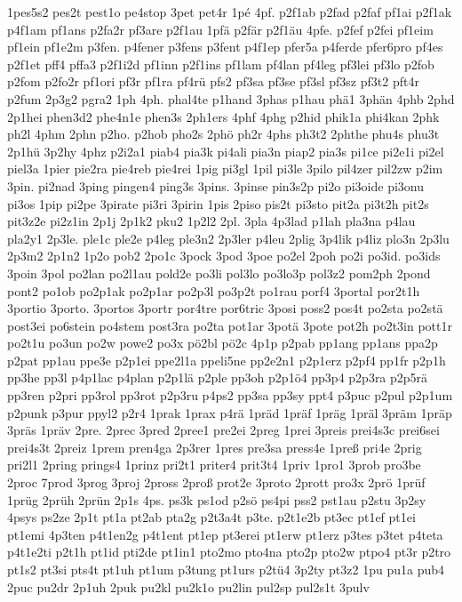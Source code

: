 {1pes5s2
pes2t
pest1o
pe4stop
3pet
pet4r
1pé
4pf.
p2f1ab
p2fad
p2faf
pf1ai
p2f1ak
p4f1am
pf1ans
p2fa2r
pf3are
p2f1au
1pfä
p2fär
p2f1äu
4pfe.
p2fef
p2fei
pf1eim
pf1ein
pf1e2m
p3fen.
p4fener
p3fens
p3fent
p4f1ep
pfer5a
p4ferde
pfer6pro
pf4es
p2f1et
pff4
pffa3
p2f1i2d
pf1inn
p2f1ins
pf1lam
pf4lan
pf4leg
pf3lei
pf3lo
p2fob
p2fom
p2fo2r
pf1ori
pf3r
pf1ra
pf4rü
pfs2
pf3sa
pf3se
pf3sl
pf3sz
pf3t2
pft4r
p2fum
2p3g2
pgra2
1ph
4ph.
phal4te
p1hand
3phas
p1hau
phä1
3phän
4phb
2phd
2p1hei
phen3d2
phe4n1e
phen3s
2ph1ers
4phf
4phg
p2hid
phik1a
phi4kan
2phk
ph2l
4phm
2phn
p2ho.
p2hob
pho2s
2phö
ph2r
4phs
ph3t2
2phthe
phu4s
phu3t
2p1hü
3p2hy
4phz
p2i2a1
piab4
pia3k
pi4ali
pia3n
piap2
pia3s
pi1ce
pi2e1i
pi2el
piel3a
1pier
pie2ra
pie4reb
pie4rei
1pig
pi3gl
1pil
pi3le
3pilo
pil4zer
pil2zw
p2im
3pin.
pi2nad
3ping
pingen4
ping3s
3pins.
3pinse
pin3s2p
pi2o
pi3oide
pi3onu
pi3os
1pip
pi2pe
3pirate
pi3ri
3pirin
1pis
2piso
pis2t
pi3sto
pit2a
pi3t2h
pit2s
pit3z2e
pi2z1in
2p1j
2p1k2
pku2
1p2l2
2pl.
3pla
4p3lad
p1lah
pla3na
p4lau
pla2y1
2p3le.
ple1c
ple2e
p4leg
ple3n2
2p3ler
p4leu
2plig
3p4lik
p4liz
plo3n
2p3lu
2p3m2
2p1n2
1p2o
pob2
2po1c
3pock
3pod
3poe
po2el
2poh
po2i
po3id.
po3ids
3poin
3pol
po2lan
po2l1au
pold2e
po3li
pol3lo
po3lo3p
pol3z2
pom2ph
2pond
pont2
po1ob
po2p1ak
po2p1ar
po2p3l
po3p2t
po1rau
porf4
3portal
por2t1h
3portio
3porto.
3portos
3portr
por4tre
por6tric
3posi
poss2
pos4t
po2sta
po2stä
post3ei
po6stein
po4stem
post3ra
po2ta
pot1ar
3potä
3pote
pot2h
po2t3in
pott1r
po2t1u
po3un
po2w
powe2
po3x
pö2bl
pö2c
4p1p
p2pab
pp1ang
pp1ans
ppa2p
p2pat
pp1au
ppe3e
p2p1ei
ppe2l1a
ppeli5ne
pp2e2n1
p2p1erz
p2pf4
pp1fr
p2p1h
pp3he
pp3l
p4p1lac
p4plan
p2p1lä
p2ple
pp3oh
p2p1ö4
pp3p4
p2p3ra
p2p5rä
pp3ren
p2pri
pp3rol
pp3rot
p2p3ru
p4ps2
pp3sa
pp3sy
ppt4
p3puc
p2pul
p2p1um
p2punk
p3pur
ppyl2
p2r4
1prak
1prax
p4rä
1präd
1präf
1präg
1präl
3präm
1präp
3präs
1präv
2pre.
2prec
3pred
2pree1
pre2ei
2preg
1prei
3preis
prei4s3c
prei6sei
prei4s3t
2preiz
1prem
pren4ga
2p3rer
1pres
pre3sa
press4e
1preß
pri4e
2prig
pri2l1
2pring
prings4
1prinz
pri2t1
priter4
prit3t4
1priv
1pro1
3prob
pro3be
2proc
7prod
3prog
3proj
2pross
2proß
prot2e
3proto
2prott
pro3x
2prö
1prüf
1prüg
2prüh
2prün
2p1s
4ps.
ps3k
ps1od
p2sö
ps4pi
pss2
pst1au
p2stu
3p2sy
4psys
ps2ze
2p1t
pt1a
pt2ab
pta2g
p2t3a4t
p3te.
p2t1e2b
pt3ec
pt1ef
pt1ei
pt1emi
4p3ten
p4t1en2g
p4t1ent
pt1ep
pt3erei
pt1erw
pt1erz
p3tes
p3tet
p4teta
p4t1e2ti
p2t1h
pt1id
pti2de
pt1in1
pto2mo
pto4na
pto2p
pto2w
ptpo4
pt3r
p2tro
pt1s2
pt3si
pts4t
pt1uh
pt1um
p3tung
pt1urs
p2tü4
3p2ty
pt3z2
1pu
pu1a
pub4
2puc
pu2dr
2p1uh
2puk
pu2kl
pu2k1o
pu2lin
pul2sp
pul2s1t
3pulv
}
